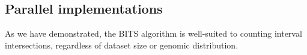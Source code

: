 \documentclass{bioinfo}
\begin{document}
	\subsection{Parallel implementations}
	
	As we have demonstrated, the BITS algorithm is well-suited to counting
	interval intersections, regardless of dataset size or genomic distribution.
	  
\end{document}
